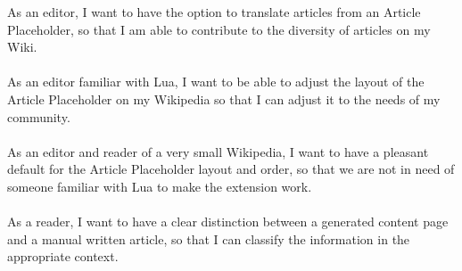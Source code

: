 As an editor, I want to have the option to translate articles from an Article Placeholder, so that I am able to contribute to the diversity of articles on my Wiki. \\
\\
As an editor familiar with Lua, I want to be able to adjust the layout of the Article Placeholder on my Wikipedia so that I can adjust it to the needs of my community. \\
\\
As an editor and reader of a very small Wikipedia, I want to have a pleasant default for the Article Placeholder layout and order, so that we are not in need of someone familiar with Lua to make the extension work. \\
\\
As a reader, I want to have a clear distinction between a generated content page and a manual written article, so that I can classify the information in the appropriate context. \